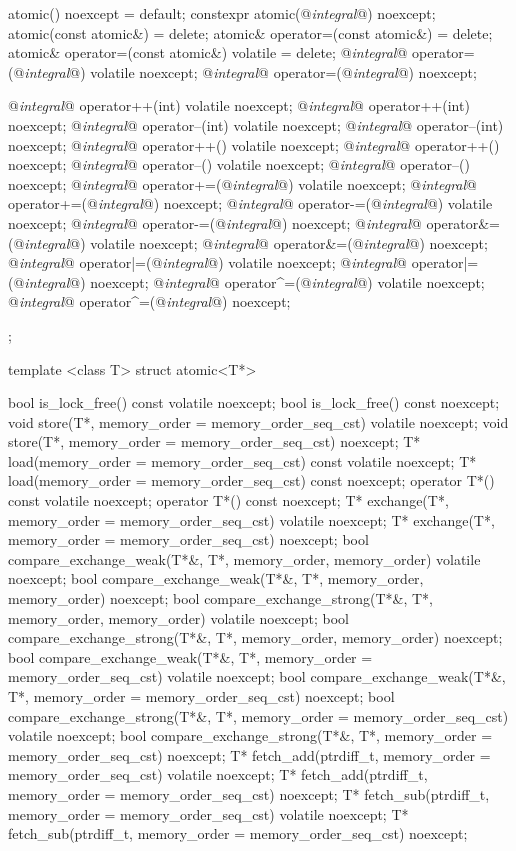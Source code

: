 \begin{codeblock}
{{    atomic() noexcept = default;
    constexpr atomic(@\textit{integral}@) noexcept;
    atomic(const atomic&) = delete;
    atomic& operator=(const atomic&) = delete;
    atomic& operator=(const atomic&) volatile = delete;
    @\textit{integral}@ operator=(@\textit{integral}@) volatile noexcept;
    @\textit{integral}@ operator=(@\textit{integral}@) noexcept;

    @\textit{integral}@ operator++(int) volatile noexcept;
    @\textit{integral}@ operator++(int) noexcept;
    @\textit{integral}@ operator--(int) volatile noexcept;
    @\textit{integral}@ operator--(int) noexcept;
    @\textit{integral}@ operator++() volatile noexcept;
    @\textit{integral}@ operator++() noexcept;
    @\textit{integral}@ operator--() volatile noexcept;
    @\textit{integral}@ operator--() noexcept;
    @\textit{integral}@ operator+=(@\textit{integral}@) volatile noexcept;
    @\textit{integral}@ operator+=(@\textit{integral}@) noexcept;
    @\textit{integral}@ operator-=(@\textit{integral}@) volatile noexcept;
    @\textit{integral}@ operator-=(@\textit{integral}@) noexcept;
    @\textit{integral}@ operator&=(@\textit{integral}@) volatile noexcept;
    @\textit{integral}@ operator&=(@\textit{integral}@) noexcept;
    @\textit{integral}@ operator|=(@\textit{integral}@) volatile noexcept;
    @\textit{integral}@ operator|=(@\textit{integral}@) noexcept;
    @\textit{integral}@ operator^=(@\textit{integral}@) volatile noexcept;
    @\textit{integral}@ operator^=(@\textit{integral}@) noexcept;
  };

  template <class T> struct atomic<T*> {
    bool is_lock_free() const volatile noexcept;
    bool is_lock_free() const noexcept;
    void store(T*, memory_order = memory_order_seq_cst) volatile noexcept;
    void store(T*, memory_order = memory_order_seq_cst) noexcept;
    T* load(memory_order = memory_order_seq_cst) const volatile noexcept;
    T* load(memory_order = memory_order_seq_cst) const noexcept;
    operator T*() const volatile noexcept;
    operator T*() const noexcept;
    T* exchange(T*, memory_order = memory_order_seq_cst) volatile noexcept;
    T* exchange(T*, memory_order = memory_order_seq_cst) noexcept;
    bool compare_exchange_weak(T*&, T*, memory_order, memory_order) volatile noexcept;
    bool compare_exchange_weak(T*&, T*, memory_order, memory_order) noexcept;
    bool compare_exchange_strong(T*&, T*, memory_order, memory_order) volatile noexcept;
    bool compare_exchange_strong(T*&, T*, memory_order, memory_order) noexcept;
    bool compare_exchange_weak(T*&, T*, memory_order = memory_order_seq_cst) volatile noexcept;
    bool compare_exchange_weak(T*&, T*, memory_order = memory_order_seq_cst) noexcept;
    bool compare_exchange_strong(T*&, T*, memory_order = memory_order_seq_cst) volatile noexcept;
    bool compare_exchange_strong(T*&, T*, memory_order = memory_order_seq_cst) noexcept;
    T* fetch_add(ptrdiff_t, memory_order = memory_order_seq_cst) volatile noexcept;
    T* fetch_add(ptrdiff_t, memory_order = memory_order_seq_cst) noexcept;
    T* fetch_sub(ptrdiff_t, memory_order = memory_order_seq_cst) volatile noexcept;
    T* fetch_sub(ptrdiff_t, memory_order = memory_order_seq_cst) noexcept;

}}
\end{codeblock}
